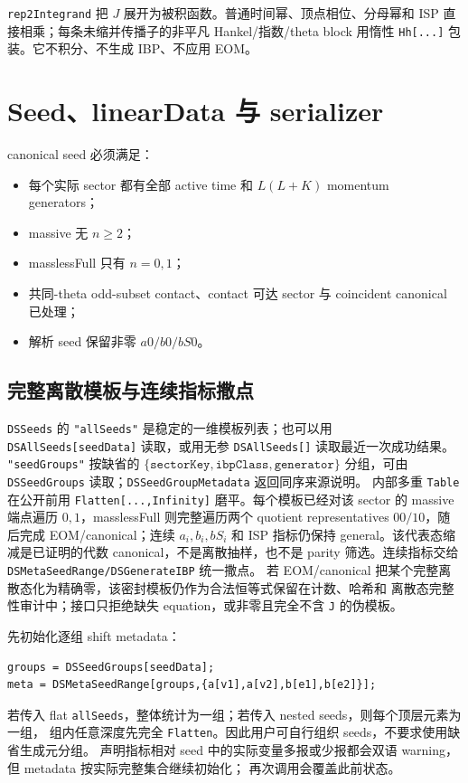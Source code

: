 ﻿\documentclass[a4paper,11pt]{article}
\begin{document}
\texttt{rep2Integrand} 把 $J$ 展开为被积函数。普通时间幂、顶点相位、分母幂和 ISP 直接相乘；每条未缩并传播子的非平凡 Hankel/指数/theta block 用惰性 \texttt{Hh[...]} 包装。它不积分、不生成 IBP、不应用 EOM。

\section{Seed、linearData 与 serializer}

canonical seed 必须满足：
\begin{itemize}
  \item 每个实际 sector 都有全部 active time 和 $L(L+K)$ momentum generators；
  \item massive 无 $n\ge2$；
  \item masslessFull 只有 $n=0,1$；
  \item 共同-theta odd-subset contact、contact 可达 sector 与 coincident canonical 已处理；
  \item 解析 seed 保留非零 $a0/b0/bS0$。
\end{itemize}

\subsection{完整离散模板与连续指标撒点}

\texttt{DSSeeds} 的 \texttt{"allSeeds"} 是稳定的一维模板列表；也可以用
\texttt{DSAllSeeds[seedData]} 读取，或用无参 \texttt{DSAllSeeds[]} 读取最近一次成功结果。
\texttt{"seedGroups"} 按缺省的 $\{\texttt{sectorKey},\texttt{ibpClass},\texttt{generator}\}$
分组，可由 \texttt{DSSeedGroups} 读取；\texttt{DSSeedGroupMetadata} 返回同序来源说明。
内部多重 \texttt{Table} 在公开前用 \texttt{Flatten[...,Infinity]} 磨平。每个模板已经对该
sector 的 massive 端点遍历 $0,1$，masslessFull 则完整遍历两个 quotient representatives $00/10$，随后完成 EOM/canonical；连续 $a_i,b_i,bS_i$ 和 ISP 指标仍保持 general。该代表态缩减是已证明的代数 canonical，不是离散抽样，也不是 parity 筛选。连续指标交给
\texttt{DSMetaSeedRange/DSGenerateIBP} 统一撒点。
若 EOM/canonical 把某个完整离散态化为精确零，该密封模板仍作为合法恒等式保留在计数、哈希和
离散态完整性审计中；接口只拒绝缺失 equation，或非零且完全不含 \texttt{J} 的伪模板。

先初始化逐组 shift metadata：
\begin{verbatim}
groups = DSSeedGroups[seedData];
meta = DSMetaSeedRange[groups,{a[v1],a[v2],b[e1],b[e2]}];
\end{verbatim}
若传入 flat \texttt{allSeeds}，整体统计为一组；若传入 nested seeds，则每个顶层元素为一组，
组内任意深度先完全 \texttt{Flatten}。因此用户可自行组织 seeds，不要求使用缺省生成元分组。
声明指标相对 seed 中的实际变量多报或少报都会双语 warning，但 metadata 按实际完整集合继续初始化；
再次调用会覆盖此前状态。
\end{document}
